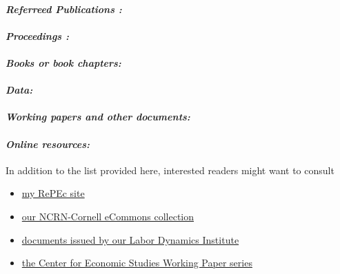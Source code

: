 \documentclass[10pt,letterpaper]{report}
\begin{document}

\paragraph{\it \bf Referreed Publications :}%
\printbibliography[type=article,heading=none]
\paragraph{\it \bf Proceedings :}%
\printbibliography[filter=collective,heading=none]
\paragraph{\it \bf Books or book chapters:}%
\printbibliography[filter=books,heading=none]
\paragraph{\it \bf Data:}%
\printbibliography[category=dataset,heading=none]
\paragraph{\it \bf Working papers and other documents:}%
\printbibliography[notcategory=dataset,type=report,heading=none]
\paragraph{\it \bf Online resources:}%
\printbibliography[type=online,heading=none]

In addition to the list provided here, interested readers might want to consult
\begin{itemize}
\item \href{http://ideas.repec.org/e/pvi26.html}{my RePEc site}
\item \href{http://ecommons.library.cornell.edu/handle/1813/30503}{our NCRN-Cornell 
eCommons collection}
\item \href{http://www.ilr.cornell.edu/LDI/documents/index.html}{documents issued by our 
Labor Dynamics Institute}
\item \href{http://ideas.repec.org/s/cen/wpaper.html}{the Center for Economic Studies Working 
Paper series}
\end{itemize}
\end{document}
